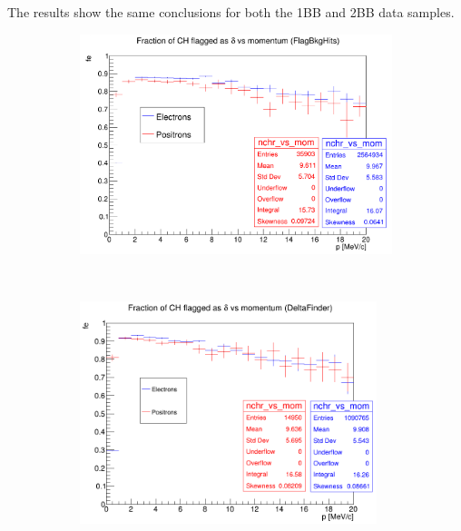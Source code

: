 The results show the same conclusions for both the 1BB and 2BB data samples.



    \begin{figure}[!h]
        \centering
        \begin{subfigure}[t]{0.5\textwidth}
            \centering
            \includegraphics[width=1.\textwidth]{figures/png/Screenshot_20240818_155835.png}
            \caption{}
        \end{subfigure}%
        ~ 
        \begin{subfigure}[t]{0.5\textwidth}
            \centering
            \includegraphics[width=0.95\textwidth]{figures/png/Screenshot_20240813_203916.png}
            \caption{}
        \end{subfigure}
        \caption[]{
        }
        \label{fig:efficiency}
      \end{figure} 

